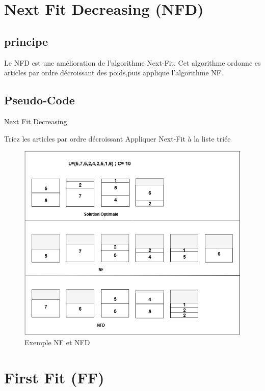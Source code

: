 \documentclass[class=article, crop=false]{standalone}
\begin{document}
\section{Next Fit Decreasing (NFD)}
\subsection{principe}
Le NFD est une amélioration de l’algorithme Next-Fit. Cet algorithme ordonne es articles par
 ordre décroissant des poids,puis applique l’algorithme NF.

\subsection{Pseudo-Code}
\begin{algorithm}
    \caption{Next Fit Decreasing }
    \begin{algorithmic}
        \STATE Triez les articles par ordre décroissant
        \STATE Appliquer Next-Fit à la liste triée
    \end{algorithmic}
\end{algorithm}

\begin{figure}[H]
    \includegraphics[width=\linewidth]{../figures/NF NFD better(1).png}
    \caption{Exemple NF et NFD}
\end{figure}
\section{First Fit (FF)}
\end{document}
